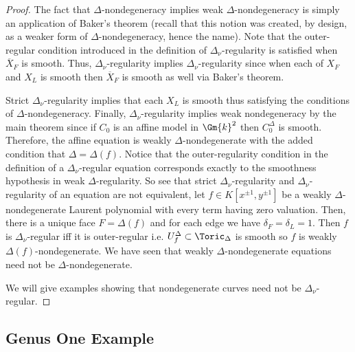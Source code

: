 \begin{proof}
The fact that $\Delta$-nondegeneracy implies weak $\Delta$-nondegeneracy is simply an application of Baker's theorem (recall that this notion was created, by design, as a weaker form of $\Delta$-nondegeneracy, hence the name).  Note that the outer-regular condition introduced in the definition of $\Delta_\nu$-regularity is satisfied when $\overline{X}_F$ is smooth. Thus, $\Delta_\nu$-regularity implies $\Delta_\nu$-regularity since when each of $X_F$ and $X_L$ is smooth then $\overline{X}_F$ is smooth as well via Baker's theorem. 
\par
Strict $\Delta_\nu$-regularity implies that each $X_L$ is smooth thus satisfying the conditions of $\Delta$-nondegeneracy.
Finally, $\Delta_\nu$-regularity implies weak nondegeneracy by the main theorem since if $C_0$ is an affine model in $\Gm{k}^2$ then $C_0^\Delta$ is smooth. Therefore, the affine equation is weakly $\Delta$-nondegenerate with the added condition that $\Delta = \Delta(f)$. Notice that the outer-regularity condition in the definition of a $\Delta_\nu$-regular equation corresponds exactly to the smoothness hypothesis in weak $\Delta$-regularity. So see that strict $\Delta_\nu$-regularity and $\Delta_\nu$-regularity of an equation are not equivalent, let $f \in K[x^{\pm 1}, y^{\pm 1}]$ be a weakly $\Delta$-nondegenerate Laurent polynomial with every term having zero valuation. Then, there is a unique face $F = \Delta(f)$ and for each edge we have $\delta_F = \delta_L = 1$. Then $f$ is $\Delta_\nu$-regular iff it is outer-regular i.e. $U_f^\Delta \subset \Toric_\Delta$ is smooth so $f$ is weakly $\Delta(f)$-nondegenerate. We have seen that weakly $\Delta$-nondegenerate equations need not be $\Delta$-nondegenerate. 
\par
We will give examples showing that nondegenerate curves need not be $\Delta_\nu$-regular.
\end{proof}

\subsection{Genus One Example}

